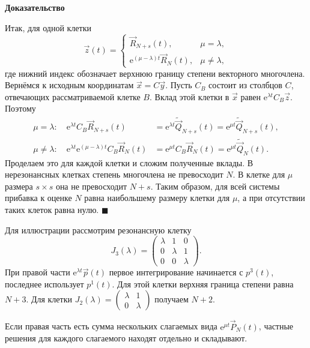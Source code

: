 \documentclass[12pt,a4paper]{article}
\numberwithin{equation}{section}
\newcommand{\vect}[1]{\vec{#1}}
\newcommand{\e}{\mathrm{e}}
\renewenvironment{proof}[1][Доказательство]{\begin{center}\textbf{#1}\end{center}}{\hfill$\blacksquare$\par}
\begin{document}
\begin{proof}
Итак, для одной клетки
\[
 \vect z(t)=
 \begin{cases}
 \vect R_{N+s}(t),&\mu=\lambda,\\
 \e^{(\mu-\lambda)t}\vect R_N(t),&\mu\ne\lambda,
 \end{cases}
\]
где нижний индекс обозначает верхнюю границу степени векторного
многочлена. Вернёмся к исходным координатам $\vect x=C\vect y$.
Пусть $C_B$ состоит из столбцов $C$, отвечающих рассматриваемой
клетке $B$. Вклад этой клетки в $\vect x$ равен $\e^{\lambda t}C_B\vect z$. Поэтому
\[
 \begin{aligned}
 \mu=\lambda:\quad
 \e^{\lambda t}C_B\vect R_{N+s}(t)
 &=\e^{\lambda t}\widetilde{\vect Q}_{N+s}(t)
  =\e^{\mu t}\widetilde{\vect Q}_{N+s}(t),\\
 \mu\ne\lambda:\quad
 \e^{\lambda t}\e^{(\mu-\lambda)t}C_B\vect R_N(t)
 &=\e^{\mu t}C_B\vect R_N(t)
  =\e^{\mu t}\widetilde{\vect Q}_N(t).
 \end{aligned}
\]
Проделаем это для каждой клетки и сложим полученные вклады.
В нерезонансных клетках степень многочлена не превосходит $N$.
В клетке для $\mu$ размера $s\times s$ она не превосходит $N+s$.
Таким образом, для всей системы прибавка к оценке $N$ равна наибольшему
размеру клетки для $\mu$, а при отсутствии таких клеток равна нулю.
\end{proof}

Для иллюстрации рассмотрим резонансную клетку
\[
 J_3(\lambda)=\begin{pmatrix}\lambda&1&0\\0&\lambda&1\\0&0&\lambda\end{pmatrix}.
\]
При правой части $\e^{\lambda t}\vect p(t)$ первое интегрирование
начинается с $p^3(t)$, последнее использует $p^1(t)$.
Для этой клетки верхняя граница степени равна $N+3$.
Для клетки $J_2(\lambda)=\begin{pmatrix}\lambda&1\\0&\lambda\end{pmatrix}$
получаем $N+2$.


Если правая часть есть сумма нескольких слагаемых вида \(\e^{\mu t}\vect P_N(t)\), частные решения для каждого слагаемого находят отдельно и складывают.
\end{document}
